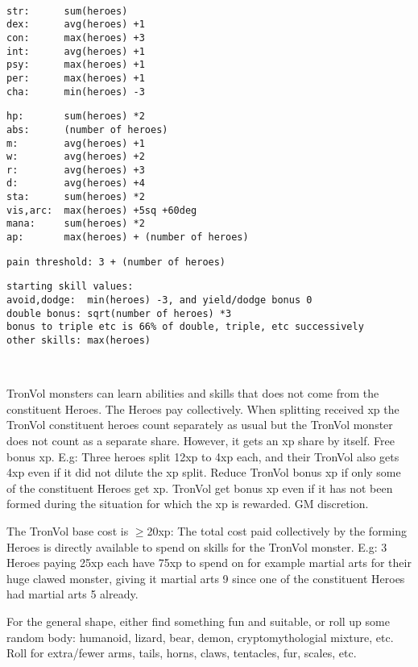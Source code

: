 \

\small \begin{samepage} \begin{verbatim}
str:      sum(heroes)
dex:      avg(heroes) +1
con:      max(heroes) +3
int:      avg(heroes) +1
psy:      max(heroes) +1
per:      max(heroes) +1
cha:      min(heroes) -3
\end{verbatim} \blocklistgap \begin{verbatim}
hp:       sum(heroes) *2
abs:      (number of heroes)
m:        avg(heroes) +1
w:        avg(heroes) +2
r:        avg(heroes) +3
d:        avg(heroes) +4
sta:      sum(heroes) *2
vis,arc:  max(heroes) +5sq +60deg
mana:     sum(heroes) *2
ap:       max(heroes) + (number of heroes)
\end{verbatim} \blocklistgap \begin{verbatim}
pain threshold: 3 + (number of heroes)
\end{verbatim} \blocklistgap \begin{verbatim}
starting skill values:
avoid,dodge:  min(heroes) -3, and yield/dodge bonus 0
double bonus: sqrt(number of heroes) *3
bonus to triple etc is 66% of double, triple, etc successively
other skills: max(heroes)
\end{verbatim} \end{samepage} \normalsize

\

TronVol monsters can learn abilities and skills that does not come from the constituent Heroes. The Heroes pay collectively. When splitting received xp the TronVol constituent heroes count separately as usual but the TronVol monster does not count as a separate share. However, it gets an xp share by itself. Free bonus xp. E.g: Three heroes split 12xp to 4xp each, and their TronVol also gets 4xp even if it did not dilute the xp split. Reduce TronVol bonus xp if only some of the constituent Heroes get xp. TronVol get bonus xp even if it has not been formed during the situation for which the xp is rewarded. GM discretion.

The TronVol base cost is $\geq$20xp: The total cost paid collectively by the forming Heroes is directly available to spend on skills for the TronVol monster. E.g: 3 Heroes paying 25xp each have 75xp to spend on for example martial arts for their huge clawed monster, giving it martial arts 9 since one of the constituent Heroes had martial arts 5 already.

For the general shape, either find something fun and suitable, or roll up some random body: humanoid, lizard, bear, demon, cryptomythologial mixture, etc. Roll for extra/fewer arms, tails, horns, claws, tentacles, fur, scales, etc.

